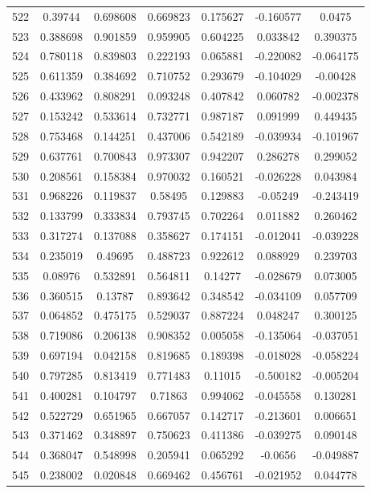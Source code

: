 \begin{table}
\begin{tabular}{c|c|c|c|c|c|c}
522 & 0.39744 & 0.698608 & 0.669823 & 0.175627 & -0.160577 & 0.0475\\
523 & 0.388698 & 0.901859 & 0.959905 & 0.604225 & 0.033842 & 0.390375\\
524 & 0.780118 & 0.839803 & 0.222193 & 0.065881 & -0.220082 & -0.064175\\
525 & 0.611359 & 0.384692 & 0.710752 & 0.293679 & -0.104029 & -0.00428\\
526 & 0.433962 & 0.808291 & 0.093248 & 0.407842 & 0.060782 & -0.002378\\
527 & 0.153242 & 0.533614 & 0.732771 & 0.987187 & 0.091999 & 0.449435\\
528 & 0.753468 & 0.144251 & 0.437006 & 0.542189 & -0.039934 & -0.101967\\
529 & 0.637761 & 0.700843 & 0.973307 & 0.942207 & 0.286278 & 0.299052\\
530 & 0.208561 & 0.158384 & 0.970032 & 0.160521 & -0.026228 & 0.043984\\
531 & 0.968226 & 0.119837 & 0.58495 & 0.129883 & -0.05249 & -0.243419\\
532 & 0.133799 & 0.333834 & 0.793745 & 0.702264 & 0.011882 & 0.260462\\
533 & 0.317274 & 0.137088 & 0.358627 & 0.174151 & -0.012041 & -0.039228\\
534 & 0.235019 & 0.49695 & 0.488723 & 0.922612 & 0.088929 & 0.239703\\
535 & 0.08976 & 0.532891 & 0.564811 & 0.14277 & -0.028679 & 0.073005\\
536 & 0.360515 & 0.13787 & 0.893642 & 0.348542 & -0.034109 & 0.057709\\
537 & 0.064852 & 0.475175 & 0.529037 & 0.887224 & 0.048247 & 0.300125\\
538 & 0.719086 & 0.206138 & 0.908352 & 0.005058 & -0.135064 & -0.037051\\
539 & 0.697194 & 0.042158 & 0.819685 & 0.189398 & -0.018028 & -0.058224\\
540 & 0.797285 & 0.813419 & 0.771483 & 0.11015 & -0.500182 & -0.005204\\
541 & 0.400281 & 0.104797 & 0.71863 & 0.994062 & -0.045558 & 0.130281\\
542 & 0.522729 & 0.651965 & 0.667057 & 0.142717 & -0.213601 & 0.006651\\
543 & 0.371462 & 0.348897 & 0.750623 & 0.411386 & -0.039275 & 0.090148\\
544 & 0.368047 & 0.548998 & 0.205941 & 0.065292 & -0.0656 & -0.049887\\
545 & 0.238002 & 0.020848 & 0.669462 & 0.456761 & -0.021952 & 0.044778\\

\end{tabular}
\end{table}
